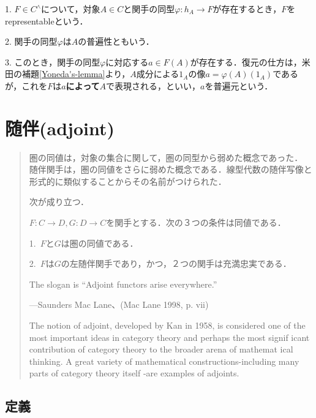 \documentclass[uplatex, dvipdfmx]{jsreport}
\begin{document}
\begin{definition}[表現可能関手]
    
    1. $F\in C^\wedge$について，対象$A\in C$と関手の同型$\varphi :h_A\to F$が存在するとき，$F$をrepresentableという．

    2. 関手の同型$\varphi$は$A$の普遍性ともいう．
    
    3. このとき，関手の同型$\varphi$に対応する$a\in F(A)$が存在する．復元の仕方は，米田の補題\ref{Yoneda's-lemma}より，$A$成分による$1_A$の像$a=\varphi (A)(1_A)$であるが，これを$F$は\textbf{$a$によって}$A$で表現される，といい，$a$を普遍元という．
\end{definition}



\chapter{随伴(adjoint)}

\begin{quotation}
    圏の同値は，対象の集合に関して，圏の同型から弱めた概念であった．
    随伴関手は，圏の同値をさらに弱めた概念である．線型代数の随伴写像と形式的に類似することからその名前がつけられた．

    次が成り立つ．
    \begin{proposition}
        $F:C\to D, G:D\to C$を関手とする．次の３つの条件は同値である．\rm{}

        1.\, $F$と$G$は圏の同値である．

        2.\, $F$は$G$の左随伴関手であり，かつ，２つの関手は充満忠実である．
    \end{proposition}

    The slogan is “Adjoint functors arise everywhere.”
    \begin{flushright}
        —Saunders Mac Lane、(Mac Lane 1998, p. vii)
    \end{flushright}
    The notion of adjoint, developed by Kan in 1958, is considered one of the most important ideas in category theory and perhaps the most signif­ icant contribution of category theory to the broader arena of mathemat­ ical thinking. A great variety of mathematical constructions-including many parts of category theory itself -are examples of adjoints.\cite{Pierce}
\end{quotation}

\section{定義}
\end{document}
